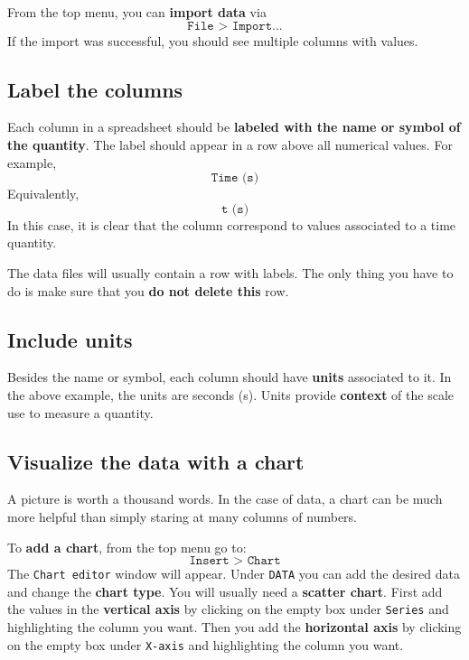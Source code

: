 From the top menu, you can \textbf{import data} via
\begin{equation}
    \texttt{File > Import...}
\end{equation}
If the import was successful, you should see multiple columns with values.
%
\subsection{Label the columns}
%
Each column in a spreadsheet should be \textbf{labeled with the name or symbol of the quantity}. The label should appear in a row above all numerical values. For example,
\begin{equation}
    \texttt{Time (s)}
\end{equation}
Equivalently,
\begin{equation}
    \texttt{t (s)}
\end{equation}
In this case, it is clear that the column correspond to values associated to a time quantity.

The data files will usually contain a row with labels. The only thing you have to do is make sure that you \textbf{do not delete this} row.
%
\subsection{Include units}
%
Besides the name or symbol, each column should have \textbf{units} associated to it. In the above example, the units are seconds (s). Units provide \textbf{context} of the scale use to measure a quantity.
%
\subsection{Visualize the data with a chart}
%
A picture is worth a thousand words. In the case of data, a chart can be much more helpful than simply staring at many columns of numbers.

To \textbf{add a chart}, from the top menu go to:
\begin{equation}
    \texttt{Insert > Chart}
\end{equation}
The \texttt{Chart editor} window will appear. Under \texttt{DATA} you can add the desired data and change the \textbf{chart type}. You will usually need a \textbf{scatter chart}. First add the values in the \textbf{vertical axis} by clicking on the empty box under \texttt{Series} and highlighting the column you want. Then you add the \textbf{horizontal axis} by clicking on the empty box under \texttt{X-axis} and highlighting the column you want.

